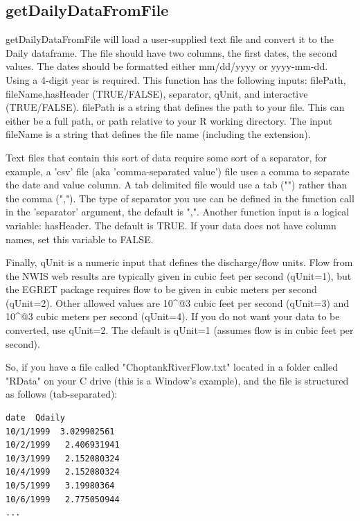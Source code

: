 \documentclass[a4paper,11pt]{article}
\begin{document}
\subsection{getDailyDataFromFile}
getDailyDataFromFile will load a user-supplied text file and convert it to the Daily dataframe. The file should have two columns, the first dates, the second values.  The dates should be formatted either mm/dd/yyyy or yyyy-mm-dd. Using a 4-digit year is required. This function has the following inputs: filePath, fileName,hasHeader (TRUE/FALSE), separator, qUnit, and interactive (TRUE/FALSE). filePath is a string that defines the path to your file. This can either be a full path, or path relative to your R working directory. The input fileName is a string that defines the file name (including the extension).

Text files that contain this sort of data require some sort of a separator, for example, a 'csv' file (aka 'comma-separated value') file uses a comma to separate the date and value column. A tab delimited file would use a tab ("\verb@\t@") rather than the comma (","). The type of separator you use can be defined in the function call in the 'separator' argument, the default is ",". Another function input is a logical variable: hasHeader.  The default is TRUE. If your data does not have column names, set this variable to FALSE.

Finally, qUnit is a numeric input that defines the discharge/flow units. Flow from the NWIS web results are typically given in cubic feet per second (qUnit=1), but the EGRET package requires flow to be given in cubic meters per second (qUnit=2). Other allowed values are 10\verb@^@3 cubic feet per second (qUnit=3) and 10\verb@^@3 cubic meters per second (qUnit=4). If you do not want your data to be converted, use qUnit=2. The default is qUnit=1 (assumes flow is in cubic feet per second).

So, if you have a file called "ChoptankRiverFlow.txt" located in a folder called "RData" on your C drive (this is a Window's example), and the file is structured as follows (tab-separated):
\begin{verbatim}
date  Qdaily
10/1/1999  3.029902561
10/2/1999	2.406931941
10/3/1999	2.152080324
10/4/1999	2.152080324
10/5/1999	3.19980364
10/6/1999	2.775050944
...
\end{verbatim}
\end{document}
